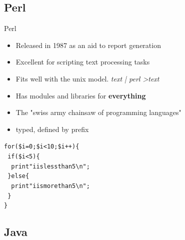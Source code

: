 \documentclass[10pt]{beamer}
\begin{document}
\subsection{Perl}

\begin{frame}{Perl}

	\begin{itemize}
		\item Released in 1987 as an aid to report generation
		\item Excellent for scripting text processing tasks
		\item Fits well with the unix model. \textit{text | perl \textgreater text}
		\item Has modules and libraries for \textbf{everything}
		\item The "swiss army chainsaw of programming languages"
		\item typed, defined by prefix
	\end{itemize}
	
	\begin{alltt}
	for(\$i=0;\$i<10;\$i++) \{ \\
		~if(\$i<5) \{        \\
			~~print "i is less than 5 \textbackslash n"; \\
		~\} else \{                                      \\
			~~print "i is more than 5 \textbackslash n"; \\
		~\} \\
	\} \\
	\end{alltt}

\end{frame}

\subsection{Java}
\end{document}
